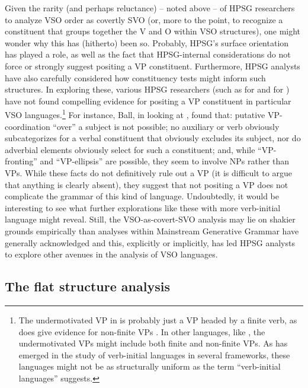 \documentclass[output=paper
	        ,collection
	        ,collectionchapter
 	        ,biblatex
                ,babelshorthands
                ,newtxmath
                ,draftmode
                ,colorlinks, citecolor=brown
]{langscibook}
\begin{document}
Given the rarity (and perhaps reluctance) -- noted above -- of HPSG researchers to analyze VSO order as covertly SVO (or, more to the point, to recognize a constituent that groups together the V and O within VSO structures), one might wonder why this has (hitherto) been so. Probably, HPSG's surface orientation has played a role, as well as the fact that HPSG-internal considerations do not force or strongly suggest positing a VP constituent. Furthermore, HPSG analysts have also carefully considered how constituency tests might inform such structures. In exploring these, various HPSG researchers (such as \citealt{borsley06} for  and \citealt[Chapter 3]{ball08thesis} for ) have not found compelling evidence for positing a VP constituent in particular VSO languages.\footnote{The undermotivated VP in  is probably just a VP headed by a finite verb, as  does give evidence for non-finite VPs \citep{BTW07}. In other languages, like , the undermotivated VPs might include both finite and non-finite VPs. As has emerged in the study of verb-initial languages in several frameworks, these languages might not be as structurally uniform as the term ``verb-initial languages'' suggests.} For instance, Ball, in looking at , found that: putative VP-coordination ``over'' a subject is not possible; no auxiliary or verb obviously subcategorizes for a verbal constituent that obviously excludes its subject, nor do adverbial elements obviously select for such a constituent; and, while ``VP-fronting'' and ``VP-ellipsis'' are possible, they seem to involve NPs rather than VPs. While these facts do not definitively rule out a VP (it is difficult to argue that anything is clearly absent), they suggest that not positing a VP does not complicate the grammar of this kind of language. Undoubtedly, it would be interesting to see what further explorations like these with more verb-initial language might reveal. Still, the VSO-as-covert-SVO analysis may lie on shakier grounds empirically than analyses within Mainstream Generative Grammar have generally acknowledged and this, explicitly or implicitly, has led HPSG analysts to explore other avenues in the analysis of VSO languages.           

\subsection{The flat structure analysis}
\label{understudied-sec-flat}
\end{document}
